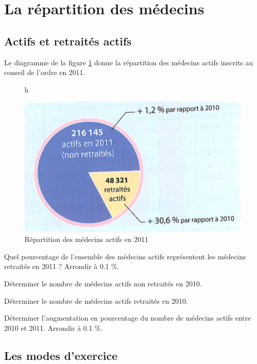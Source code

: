 \section{La répartition des médecins}

\subsection{Actifs et retraités actifs}

Le diagramme de la figure \ref{fig:repartition} donne la répartition des médecins actifs inscrits au conseil de l'ordre en 2011.

\begin{figure}{h}
	\begin{center}
		\includegraphics[scale=0.8]{repartition}
		\caption{Répartition des médecins actifs en 2011}
		\label{fig:repartition}
	\end{center}
\end{figure}


\begin{questions}
	\question Quel pourcentage de l'ensemble des médecins actifs représentent les médecins retraités en 2011 ? Arrondir à \num{0.1} \%.
	
	\question Déterminer le nombre de médecins actifs non retraités en 2010.
	
	\question Déterminer le nombre de médecins actifs retraités en 2010.
	
	\question Déterminer l'augmentation en pourcentage du nombre de médecins actifs entre 2010 et 2011. Arrondir à \num{0.1} \%.
	
\end{questions}

\subsection{Les modes d'exercice}

